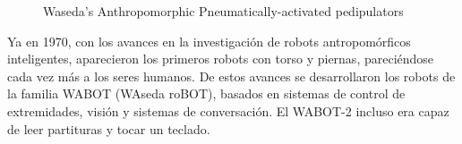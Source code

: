 \begin{figure}[H]
\quad
{}
\caption{Waseda's Anthropomorphic Pneumatically-activated pedipulators \cite{ref34}}
\label{figura210}
\end{figure}

Ya en 1970, con los avances en la investigación de robots antropomórficos inteligentes, aparecieron los primeros robots con torso y piernas, pareciéndose cada vez más a los seres humanos. De estos avances se desarrollaron los robots de la familia WABOT (WAseda roBOT), basados en sistemas de control de extremidades, visión y sistemas de conversación. El WABOT-2 incluso era capaz de leer partituras y tocar un teclado.

